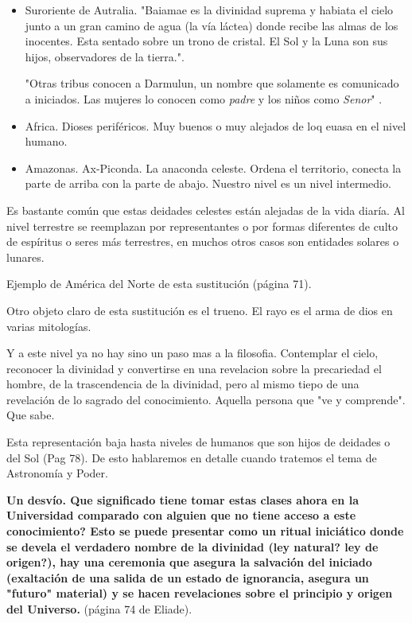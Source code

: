 \documentclass{report}
\begin{document}
\begin{itemize}
\item Suroriente de Autralia. "Baiamae es la divinidad suprema y
  habiata el cielo junto a un gran camino de agua (la v\'ia
  l\'actea) donde recibe las almas de los inocentes. Esta sentado
  sobre un trono de cristal. El Sol y la Luna son sus hijos,
  observadores de la tierra."\cite{Eliade}.

"Otras tribus conocen a Darmulun, un nombre que solamente es
  comunicado a iniciados. Las mujeres lo conocen como \emph{padre} y los
  ni\~nos como \emph{Senor}" \cite{Eliade}.

\item Africa. Dioses perif\'ericos. Muy buenos o muy alejados de loq
  euasa en el nivel humano.

\item Amazonas. Ax-Piconda. La anaconda celeste. Ordena el territorio,
  conecta la parte de arriba con la parte de abajo. Nuestro nivel es
  un nivel intermedio. 
\end{itemize}

Es bastante com\'un que estas deidades celestes est\'an alejadas de la
vida diar\'ia. Al nivel terrestre se reemplazan por representantes o
por formas diferentes de  culto de esp\'iritus o seres m\'as
terrestres, en muchos otros casos son entidades solares o lunares. 

Ejemplo de Am\'erica del Norte de esta sustituci\'on (p\'agina 71).

Otro objeto claro de esta sustituci\'on es el trueno.  El rayo es el
arma de dios en varias mitolog\'ias. 

Y a este nivel ya no hay sino un paso mas a la filosofia. Contemplar
el cielo, reconocer la divinidad y convertirse en una revelacion sobre
la precariedad el hombre, de la trascendencia de la divinidad, pero al
mismo tiepo de una revelaci\'on de lo sagrado del
conocimiento. Aquella persona que "ve y comprende". Que sabe.

Esta representaci\'on baja hasta niveles de humanos que son hijos de
deidades o del Sol \cite{Eliade} (Pag 78). De esto hablaremos en
detalle cuando tratemos el tema de Astronom\'ia y Poder.


{\bf Un desv\'io. Que significado tiene tomar estas clases ahora en la
Universidad comparado con alguien que no tiene acceso a este
conocimiento?
Esto se puede presentar como un ritual inici\'atico donde se devela el
verdadero nombre de la divinidad (ley natural? ley de origen?), hay
una ceremonia que asegura la salvaci\'on del iniciado (exaltaci\'on de
una salida de un estado de ignorancia, asegura un "futuro" material) y se hacen
revelaciones sobre el principio y origen del Universo. }(p\'agina 74
de Eliade). 
 
\end{document}
